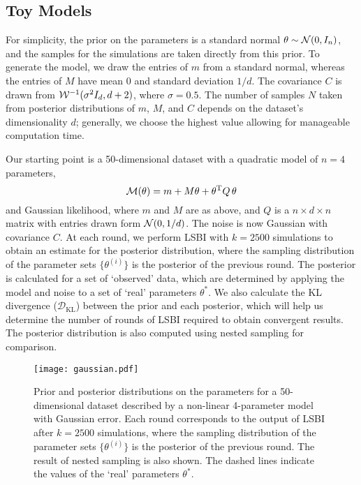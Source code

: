 \documentclass[%
 reprint,
 amsmath,amssymb,
 aps,
]{revtex4-2}
\begin{document}
\subsection{Toy Models}

For simplicity, the prior on the parameters is a standard normal $\theta\sim \mathcal{N}(0,I_n)$, and the samples for the simulations are taken directly from this prior. To generate the model, we draw the entries of $m$ from a standard normal, whereas the entries of $M$ have mean 0 and standard deviation $1/d$. The covariance $C$ is drawn from $\mathcal{W}^{-1}(\sigma^2 I_d, d+2)$, where $\sigma=0.5$. The number of samples $N$ taken from posterior distributions of $m$, $M$, and $C$ depends on the dataset's dimensionality $d$; generally, we choose the highest value allowing for manageable computation time. 


Our starting point is a 50-dimensional dataset with a quadratic model of $n=4$ parameters,
\begin{equation}\label{eq:model}
	\mathcal{M}(\theta) = m + M\theta + \theta^{\mathrm{T}} Q\, \theta
\end{equation}
and Gaussian likelihood, where $m$ and $M$ are as above, and $Q$ is a $n \times d \times n$ matrix with entries drawn form $\mathcal{N}(0,1/d)$. The noise is now Gaussian with covariance $C$. At each round, we perform LSBI with $k=2500$ simulations to obtain an estimate for the posterior distribution, where the sampling distribution of the parameter sets $\{\theta^{(i)}\}$ is the posterior of the previous round. The posterior is calculated for a set of `observed' data, which are determined by applying the model and noise to a set of `real' parameters $\theta^*$. We also calculate the KL divergence ($\mathcal{D}_\mathrm{KL}$) between the prior and each posterior, which will help us determine the number of rounds of LSBI required to obtain convergent results. The posterior distribution is also computed using nested sampling for comparison.

\begin{figure}[b]
\hspace{-4mm}
\texttt{[image: gaussian.pdf]}
\caption{\label{fig:quadratic}
Prior and posterior distributions on the parameters for a 50-dimensional dataset described by a non-linear 4-parameter model with Gaussian error. Each round corresponds to the output of LSBI after $k= 2500$ simulations, where the sampling distribution of the parameter sets $\{\theta^{(i)}\}$ is the posterior of the previous round. The result of nested sampling is also shown. The dashed lines indicate the values of the `real' parameters $\theta^\ast$.} 
\end{figure}
\end{document}
